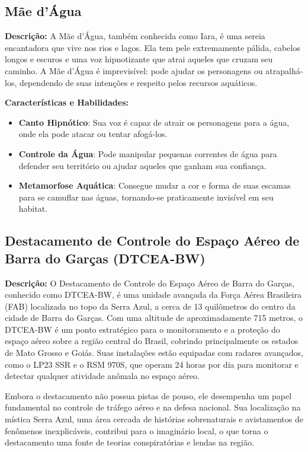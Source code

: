 \subsection{Mãe d'Água}

\textbf{Descrição:}  
A Mãe d'Água, também conhecida como Iara, é uma sereia encantadora que vive nos rios e lagos. Ela tem pele extremamente pálida, cabelos longos e escuros e uma voz hipnotizante que atrai aqueles que cruzam seu caminho. A Mãe d'Água é imprevisível: pode ajudar os personagens ou atrapalhá-los, dependendo de suas intenções e respeito pelos recursos aquáticos.

\textbf{Características e Habilidades:}
\begin{itemize}
    \item \textbf{Canto Hipnótico}: Sua voz é capaz de atrair os personagens para a água, onde ela pode atacar ou tentar afogá-los.
    \item \textbf{Controle da Água}: Pode manipular pequenas correntes de água para defender seu território ou ajudar aqueles que ganham sua confiança.
    \item \textbf{Metamorfose Aquática}: Consegue mudar a cor e forma de suas escamas para se camuflar nas águas, tornando-se praticamente invisível em seu habitat.
\end{itemize}

\subsection{Destacamento de Controle do Espaço Aéreo de Barra do Garças (DTCEA-BW)}

\textbf{Descrição:}  
O Destacamento de Controle do Espaço Aéreo de Barra do Garças, conhecido como DTCEA-BW, é uma unidade avançada da Força Aérea Brasileira (FAB) localizada no topo da Serra Azul, a cerca de 13 quilômetros do centro da cidade de Barra do Garças. Com uma altitude de aproximadamente 715 metros, o DTCEA-BW é um ponto estratégico para o monitoramento e a proteção do espaço aéreo sobre a região central do Brasil, cobrindo principalmente os estados de Mato Grosso e Goiás. Suas instalações estão equipadas com radares avançados, como o LP23 SSR e o RSM 970S, que operam 24 horas por dia para monitorar e detectar qualquer atividade anômala no espaço aéreo.

Embora o destacamento não possua pistas de pouso, ele desempenha um papel fundamental no controle de tráfego aéreo e na defesa nacional. Sua localização na mística Serra Azul, uma área cercada de histórias sobrenaturais e avistamentos de fenômenos inexplicáveis, contribui para o imaginário local, o que torna o destacamento uma fonte de teorias conspiratórias e lendas na região.

